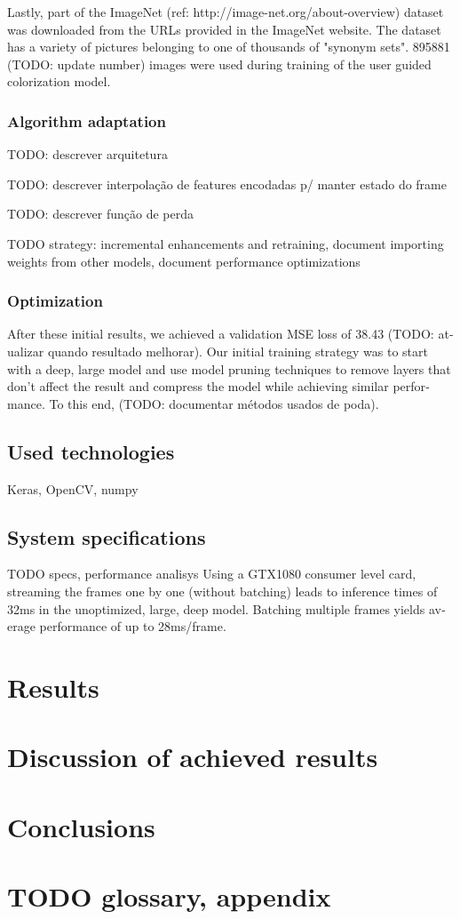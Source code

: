 \documentclass[12pt,openright,twoside,a4paper,english]{abntex2}
\begin{document}
\begin{otherlanguage}{english}
Lastly, part of the ImageNet (ref: http://image-net.org/about-overview) dataset was downloaded from the URLs provided in the ImageNet website. The dataset has a variety of pictures belonging to one of thousands of "synonym sets". 895881 (TODO: update number) images were used during training of the user guided colorization model.

\subsection{Algorithm adaptation}
TODO: descrever arquitetura

TODO: descrever interpolação de features encodadas p/ manter estado do frame

TODO: descrever função de perda

TODO strategy: incremental enhancements and retraining, document importing weights from other models, document performance optimizations

\subsection{Optimization}
After these initial results, we achieved a validation MSE loss of 38.43 (TODO: atualizar quando resultado melhorar). Our initial training strategy was to start with a deep, large model and use model pruning techniques to remove layers that don't affect the result and compress the model while achieving similar performance. To this end, (TODO: documentar métodos usados de poda).

\section{Used technologies}
Keras, OpenCV, numpy

\section{System specifications}
TODO specs, performance analisys
Using a GTX1080 consumer level card, streaming the frames one by one (without batching) leads to inference times of 32ms in the unoptimized, large, deep model. Batching multiple frames yields average performance of up to 28ms/frame.

\chapter{Results}


\chapter{Discussion of achieved results}

\chapter{Conclusions}

\chapter{TODO glossary, appendix}



\end{otherlanguage}
\end{document}
